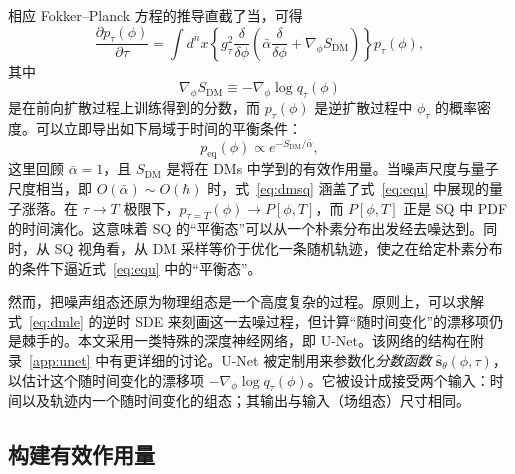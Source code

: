 相应 Fokker--Planck 方程的推导直截了当，可得
\begin{equation}
    \frac{\partial p_{\tau}(\phi)}{\partial \tau} =
    \int d^nx \left\{g^2_{\tau}  \frac{\delta}{\delta \phi}
    \left( \bar{\alpha}\frac{\delta }{\delta \phi} + \nabla_\phi S_\text{DM} \right)\right\} p_{\tau}(\phi),
    \label{eq:fp}
\end{equation}
其中
\begin{equation}
  \nabla_\phi S_\text{DM}\equiv -\nabla_\phi \log{q_{\tau}(\phi)}
\end{equation}
是在前向扩散过程上训练得到的分数，而 $p_{\tau}(\phi)$ 是逆扩散过程中 $\phi_{\tau}$ 的概率密度。可以立即导出如下局域于时间的平衡条件：
\begin{equation}
    p_\text{eq}(\phi) \propto e^ {-S_\text{DM}/\bar{\alpha}},
    \label{eq:dmsq}
\end{equation}
这里回顾 $\bar\alpha=1$，且 $S_\text{DM}$ 是将在 DMs 中学到的有效作用量。当噪声尺度与量子尺度相当，即 $O(\bar{\alpha})\sim O(\hbar)$ 时，式~\eqref{eq:dmsq} 涵盖了式~\eqref{eq:equ} 中展现的量子涨落。在 $\tau\rightarrow T$ 极限下，$ p_{\tau=T}(\phi) \rightarrow P[\phi,T]$，而 $P[\phi,T]$ 正是 SQ 中 PDF 的时间演化。这意味着 SQ 的``平衡态''可以从一个朴素分布出发经去噪达到。同时，从 SQ 视角看，从 DM 采样等价于优化一条随机轨迹，使之在给定朴素分布的条件下逼近式~\eqref{eq:equ} 中的``平衡态''。

然而，把噪声组态还原为物理组态是一个高度复杂的过程。原则上，可以求解 式~\eqref{eq:dmle} 的逆时 SDE 来刻画这一去噪过程，但计算``随时间变化''的漂移项仍是棘手的。本文采用一类特殊的深度神经网络，即 U-Net。该网络的结构在附录~\ref{app:unet} 中有更详细的讨论。U-Net 被定制用来参数化\textit{分数函数} $\hat{\mathbf{s}}_\theta(\phi,\tau)$，以估计这个随时间变化的漂移项 $-\nabla_\phi \log{q_{\tau}(\phi)}$。它被设计成接受两个输入：时间以及轨迹内一个随时间变化的组态；其输出与输入（场组态）尺寸相同。

\subsection{{构建有效作用量}}
\label{subsec:continious}

